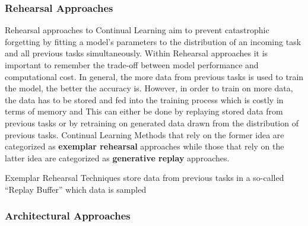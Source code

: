 \subsubsection{Rehearsal Approaches}
\label{sec:RehearsalApproaches}
Rehearsal approaches to Continual Learning aim to prevent catastrophic forgetting by fitting a model's parameters to the distribution
of an incoming task and all previous tasks simultaneously. Within Rehearsal approaches it is important to remember the trade-off between
model performance and computational cost. In general, the more data from previous tasks is used to train the model, the better the accuracy is. 
However, in order to train on more data, the data has to be stored and fed into the training process which is costly in terms of memory and This can either be done by replaying stored data from previous tasks or by
retraining on generated data drawn from the distribution of previous tasks. Continual Learning Methods that rely on the former idea are
categorized as \textbf{exemplar rehearsal} approaches while those that rely on the latter idea are categorized as \textbf{generative replay}
approaches. \par
Exemplar Rehearsal Techniques store data from previous tasks in a so-called \enquote{Replay Buffer} which data is sampled



\subsubsection{Architectural Approaches}
\label{sec:ArchitecturalApproaches}

